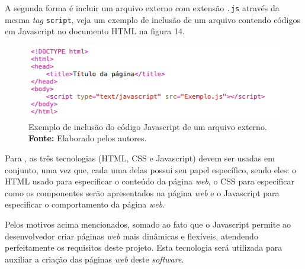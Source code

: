 A segunda forma é incluir um arquivo externo com extensão \texttt{.js} através da mesma \textit{tag} \texttt{script}, veja um exemplo de inclusão de um arquivo contendo códigos em Javascript no documento HTML na figura 14.

\begin{figure}[h!]
	\centerline{\includegraphics[scale=0.8]{./imagens/javascript_include.png}}
	\caption[Exemplo de inclusão do código Javascript de um arquivo externo]
	{Exemplo de inclusão do código Javascript de um arquivo externo. \textbf{Fonte:} Elaborado pelos autores.}
	\label{fig:exemplo1}
\end{figure}

Para , as três tecnologias (HTML, CSS e Javascript) devem ser usadas em conjunto, uma vez que, cada uma delas possui seu papel específico, sendo eles: o HTML usado para especificar o conteúdo da página \textit{web}, o CSS para especificar como os componentes serão apresentados na página \textit{web} e o Javascript para especificar o comportamento da página \textit{web}.

Pelos motivos acima mencionados, somado ao fato que o Javascript permite ao desenvolvedor criar páginas \textit{web} mais dinâmicas e flexíveis, atendendo perfeitamente os requisitos deste projeto. Esta tecnologia será utilizada para auxiliar a criação das páginas \textit{web} deste \textit{software}.